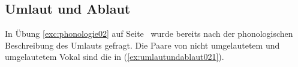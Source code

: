 \subsection{Umlaut und Ablaut}
\label{sec:umlautundablaut}


In Übung \ref{exc:phonologie02} auf Seite~\pageref{exc:phonologie02} wurde bereits nach der phonologischen Beschreibung des Umlauts gefragt.
Die Paare von nicht umgelautetem und umgelautetem Vokal sind die in (\ref{ex:umlautundablaut021}).

\begin{exe}
  \ex\label{ex:umlautundablaut021}
  \begin{xlist}
  \end{xlist}
\end{exe}


